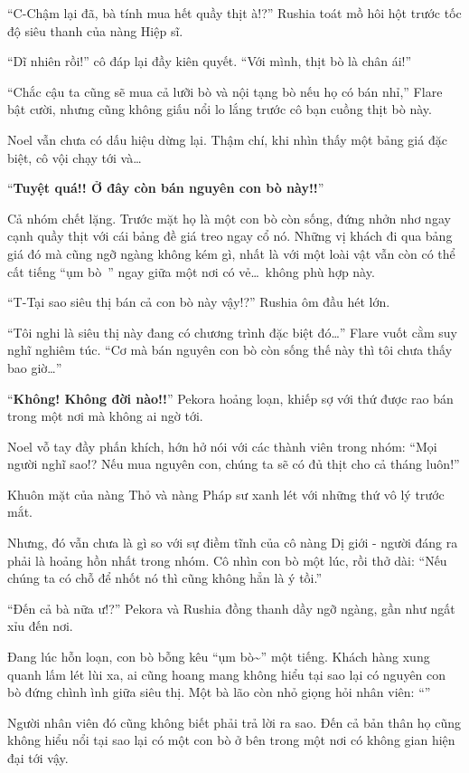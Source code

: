 \documentclass[../main.tex]{subfiles}
\begin{document}
``C-Chậm lại đã, bà tính mua hết quầy thịt à!?'' Rushia toát mồ hôi hột trước tốc độ siêu thanh của nàng Hiệp sĩ.

``Dĩ nhiên rồi!'' cô đáp lại đầy kiên quyết. ``Với mình, thịt bò là chân ái!''

``Chắc cậu ta cũng sẽ mua cả lưỡi bò và nội tạng bò nếu họ có bán nhỉ,'' Flare bật cười, nhưng cũng không giấu nổi lo lắng trước cô bạn cuồng thịt bò này.

Noel vẫn chưa có dấu hiệu dừng lại. Thậm chí, khi nhìn thấy một bảng giá đặc biệt, cô vội chạy tới và\dots

``\textbf{Tuyệt quá!! Ở đây còn bán nguyên con bò này!!}''

Cả nhóm chết lặng. Trước mặt họ là một con bò còn sống, đứng nhởn nhơ ngay cạnh quầy thịt với cái bảng đề giá treo ngay cổ nó. Những vị khách đi qua bảng giá đó mà cũng ngỡ ngàng không kém gì, nhất là với một loài vật vẫn còn có thể cất tiếng ``ụm bò~{}'' ngay giữa một nơi có vẻ\dots\ không phù hợp này.

``T-Tại sao siêu thị bán cả con bò này vậy!?'' Rushia ôm đầu hét lớn.

``Tôi nghi là siêu thị này đang có chương trình đặc biệt đó\dots'' Flare vuốt cằm suy nghĩ nghiêm túc. ``Cơ mà bán nguyên con bò còn sống thế này thì tôi chưa thấy bao giờ\dots''

``\textbf{Không! Không đời nào!!}'' Pekora hoảng loạn, khiếp sợ với thứ được rao bán trong một nơi mà không ai ngờ tới.

Noel vỗ tay đầy phấn khích, hớn hở nói với các thành viên trong nhóm: ``Mọi người nghĩ sao!? Nếu mua nguyên con, chúng ta sẽ có đủ thịt cho cả tháng luôn!''

Khuôn mặt của nàng Thỏ và nàng Pháp sư xanh lét với những thứ vô lý trước mắt.

Nhưng, đó vẫn chưa là gì so với sự điềm tĩnh của cô nàng Dị giới - người đáng ra phải là hoảng hồn nhất trong nhóm. Cô nhìn con bò một lúc, rồi thở dài: ``Nếu chúng ta có chỗ để nhốt nó thì cũng không hẳn là ý tồi.''

``Đến cả bà nữa ư!?'' Pekora và Rushia đồng thanh dầy ngỡ ngàng, gần như ngất xỉu đến nơi.

Đang lúc hỗn loạn, con bò bỗng kêu ``ụm bò\~{}'' một tiếng. Khách hàng xung quanh lấm lét lùi xa, ai cũng hoang mang không hiểu tại sao lại có nguyên con bò đứng chình ình giữa siêu thị. Một bà lão còn nhỏ giọng hỏi nhân viên: ``''

Người nhân viên đó cũng không biết phải trả lời ra sao. Đến cả bản thân họ cũng không hiểu nổi tại sao lại có một con bò ở bên trong một nơi có không gian hiện đại tới vậy.
\end{document}
